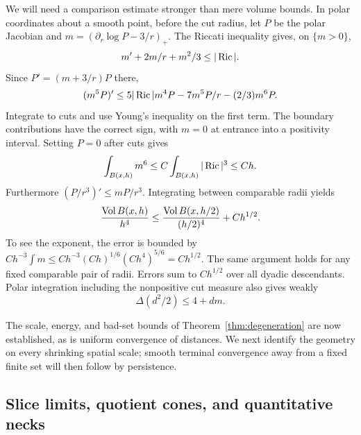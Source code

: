 We will need a comparison estimate stronger than mere volume bounds.
In polar coordinates about a smooth point, before the cut radius,
let $P$ be the polar Jacobian and
$m=(\partial_r\log P-3/r)_+$. The Riccati inequality gives, on
$\{m>0\}$,
\[
 m'+2m/r+m^2/3\leq|\operatorname{Ric}|.
\]
Since $P'=(m+3/r)P$ there,
\[
 (m^5P)'\leq5|\operatorname{Ric}|m^4P-7m^5P/r-(2/3)m^6P.
\]
Integrate to cuts and use Young's inequality on the first term.
The boundary contributions have the correct sign, with $m=0$ at
entrance into a positivity interval. Setting $P=0$ after cuts gives
\begin{equation}\label{geom:polar-defect}
 \int_{B(x,h)}m^6\leq C\int_{B(x,h)}|\operatorname{Ric}|^3\leq Ch.
\end{equation}
Furthermore $(P/r^3)'\leq mP/r^3$. Integrating between comparable
radii yields
\begin{equation}\label{geom:almost-bishop}
 \frac{\operatorname{Vol} B(x,h)}{h^4}
 \leq\frac{\operatorname{Vol} B(x,h/2)}{(h/2)^4}+Ch^{1/2}.
\end{equation}
To see the exponent, the error is bounded by
$Ch^{-3}\int m\leq Ch^{-3}(Ch)^{1/6}(Ch^4)^{5/6}=Ch^{1/2}$.
The same argument holds for any fixed comparable pair of radii.
Errors sum to $Ch^{1/2}$ over all dyadic descendants. Polar
integration including the nonpositive cut measure also gives weakly
\begin{equation}\label{geom:radial-laplacian}
 \Delta(d^2/2)\leq4+dm.
\end{equation}

The scale, energy, and bad-set bounds of Theorem~\ref{thm:degeneration}
are now established, as is uniform convergence of distances. We next
identify the geometry on every shrinking spatial scale; smooth terminal
convergence away from a fixed finite set will then follow by persistence.

\subsection{Slice limits, quotient cones, and quantitative necks}
\label{geom:slice-limits}

